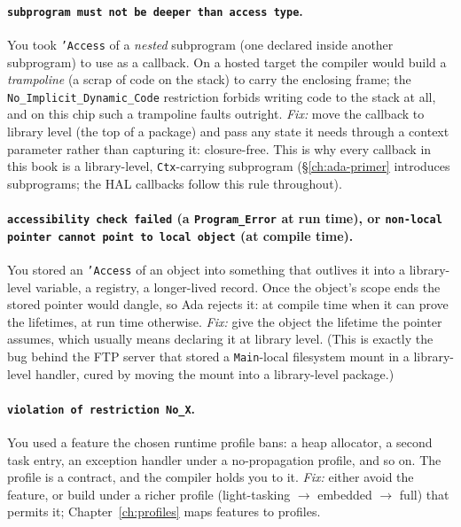 \paragraph{\texttt{subprogram must not be deeper than access type}.}
You took \texttt{'Access} of a \emph{nested} subprogram (one declared inside
another subprogram) to use as a callback. On a hosted target the compiler would
build a \emph{trampoline} (a scrap of code on the stack) to carry the enclosing
frame; the \texttt{No\_Implicit\_Dynamic\_Code} restriction forbids writing code to
the stack at all, and on this chip such a trampoline faults outright. \emph{Fix:}
move the callback to library level (the top of a package) and pass any state it
needs through a context parameter rather than capturing it: closure-free. This is
why every callback in this book is a library-level, \texttt{Ctx}-carrying
subprogram (\S\ref{ch:ada-primer} introduces subprograms; the HAL callbacks follow
this rule throughout).

\paragraph{\texttt{accessibility check failed} (a \texttt{Program\_Error} at run
time), or \texttt{non-local pointer cannot point to local object} (at compile
time).} You stored an \texttt{'Access} of an object into something that outlives it
into a library-level variable, a registry, a longer-lived record. Once the object's
scope ends the stored pointer would dangle, so Ada rejects it: at compile time when
it can prove the lifetimes, at run time otherwise. \emph{Fix:} give the object the
lifetime the pointer assumes, which usually means declaring it at library level.
(This is exactly the bug behind the FTP server that stored a \texttt{Main}-local
filesystem mount in a library-level handler, cured by moving the mount into a
library-level package.)

\paragraph{\texttt{violation of restriction No\_X}.}
You used a feature the chosen runtime profile bans: a heap allocator, a second
task entry, an exception handler under a no-propagation profile, and so on. The
profile is a contract, and the compiler holds you to it. \emph{Fix:} either avoid
the feature, or build under a richer profile (light-tasking $\rightarrow$ embedded
$\rightarrow$ full) that permits it; Chapter~\ref{ch:profiles} maps features to
profiles.

